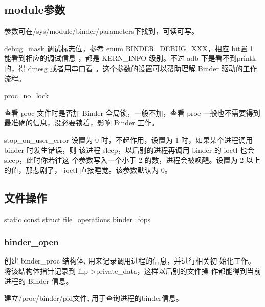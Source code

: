 \documentclass[a4paper,11pt]{article}
\begin{document}
\subsection{module参数} 
参数可在/sys/module/binder/parameters下找到，可读可写。
\begin{itemize*}
    \item debug_mask 
    调试标志位，参考 enum BINDER_DEBUG_XXX，相应 bit置 1 能看到相应的调试信息
    ，都是 KERN_INFO 级别。不过 adb 下是看不到printk 的，得 dmesg 或者用串口看
    。这个参数的设置可以帮助理解 Binder 驱动的工作流程。

    \item proc_no_lock 
    
    查看 proc 文件时是否加 Binder 全局锁，一般不加，查看 proc 一般也不需要得到
    最准确的信息，没必要锁着，影响 Binder 工作。

    \item stop_on_user_error \label{paramstop}
    设置为 0 时，不起作用，设置为 1 时，如果某个进程调用 binder 时发生错误，则
    该进程 sleep，以后别的进程再调用 binder 的 ioctl 也会 sleep，此时你若往这
    个参数写入一个小于 2 的数，进程会被唤醒。设置为 2 以上的值，那悲剧了，
    ioctl 直接睡觉。该参数默认为 0。
\end{itemize*}

\subsection{文件操作}
static const struct file_operations binder_fops

\subsubsection{binder_open}  
\begin{itemize*}
    \item 创建 binder_proc 结构体, 用来记录调用进程的信息，并进行相关初
        始化工作。将该结构体指针记录到 filp->private_data，这样以后别的文件操
        作都能得到当前进程的 Binder 信息。
    \item 建立/proc/binder/pid文件, 用于查询进程的binder信息。
\end{itemize*}
\end{document}
